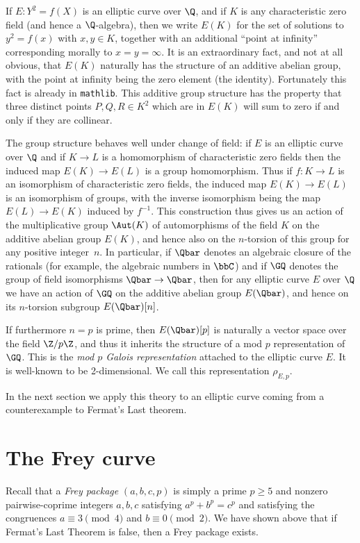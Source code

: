 If $E:Y^2=f(X)$ is an elliptic curve over $\Q$, and if $K$ is any characteristic zero field (and
hence a $\Q$-algebra), then we write $E(K)$ for the set of solutions to $y^2=f(x)$ with $x,y\in K$,
together with an additional ``point at infinity'' corresponding morally to $x=y=\infty$.
It is an extraordinary fact,
and not at all obvious, that $E(K)$ naturally has the structure of an additive abelian group,
with the point at infinity being the zero element (the identity). Fortunately this fact is
already in {\tt mathlib}. This additive group structure has
the property that three distinct points $P,Q,R\in K^2$ which are in $E(K)$ will sum to zero
if and only if they are collinear.

The group structure behaves well under change of field: if $E$ is an elliptic curve over $\Q$
and if $K\to L$ is a homomorphism of
characteristic zero fields then the induced map $E(K)\to E(L)$ is a group homomorphism.
Thus if $f:K\to L$ is an isomorphism of characteristic zero fields, the induced map $E(K)\to E(L)$
is an isomorphism of groups, with the inverse isomorphism being the map $E(L)\to E(K)$ induced
by $f^{-1}$. This construction thus gives us an action of the multiplicative group $\Aut(K)$
of automorphisms of the field $K$ on the additive abelian group $E(K)$, and hence also
on the $n$-torsion of this group for any positive integer~$n$.
In particular, if $\Qbar$ denotes an algebraic closure of the
rationals (for example, the algebraic numbers in $\bbC$) and if $\GQ$ denotes the group of field
isomorphisms $\Qbar\to\Qbar$, then for any elliptic curve $E$ over $\Q$ we have an action
of $\GQ$ on the additive abelian group $E(\Qbar)$, and hence on its $n$-torsion subgroup
$E(\Qbar)[n]$.

If furthermore $n=p$ is prime, then $E(\Qbar)[p]$ is naturally a vector space over the
field $\Z/p\Z$, and thus it inherits the structure of a mod $p$ representation of $\GQ$.
This is the \emph{mod $p$ Galois representation} attached to the elliptic curve $E$.
It is well-known to be 2-dimensional. We call this representation $\rho_{E,p}$.

In the next section we apply this theory to an elliptic curve coming from a counterexample to
Fermat's Last theorem.

\section{The Frey curve}

Recall that a \emph{Frey package} $(a,b,c,p)$ is simply a prime $p\geq5$ and nonzero
pairwise-coprime integers $a,b,c$ satisfying $a^p+b^p=c^p$ and satisfying the congruences
$a\equiv3\pmod4$ and $b\equiv0\pmod2$. We have shown above that if Fermat's Last Theorem is false,
then a Frey package exists.

